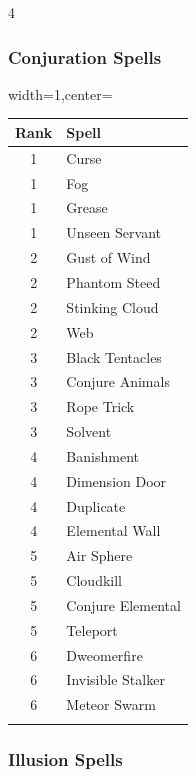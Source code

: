 \documentclass{book}
\begin{document}
\begin{multicols}{4}
\subsubsection*{Conjuration Spells}\label{conjuration-spells}
\begin{table}[H]
	\begin{adjustbox}{width=1\columnwidth,center=\columnwidth}
		\begin{tabular}{cl}
			\toprule\noalign{}
				Rank & Spell \\
			\midrule\noalign{}
				1 & Curse \\
				1 & Fog \\
				1 & Grease \\
				1 & Unseen Servant \\
				2 & Gust of Wind \\
				2 & Phantom Steed \\
				2 & Stinking Cloud \\
				2 & Web \\
				3 & Black Tentacles \\
				3 & Conjure Animals \\
				3 & Rope Trick \\
				3 & Solvent \\
				4 & Banishment \\
				4 & Dimension Door \\
				4 & Duplicate \\
				4 & Elemental Wall \\
				5 & Air Sphere \\
				5 & Cloudkill \\
				5 & Conjure Elemental \\
				5 & Teleport \\
				6 & Dweomerfire \\
				6 & Invisible Stalker \\
				6 & Meteor Swarm \\
			\bottomrule\noalign{}
		\end{tabular}
	\end{adjustbox}
\end{table}

\vfill
\subsubsection*{Illusion Spells}\label{illusion-spells}


\end{multicols}
\end{document}
